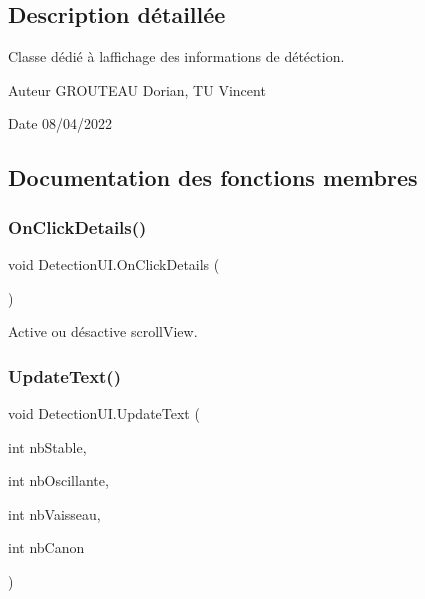 \subsection{Description détaillée}
Classe dédié à l\textquotesingle{}affichage des informations de détéction. 

\begin{DoxyAuthor}{Auteur}
G\+R\+O\+U\+T\+E\+AU Dorian, TU Vincent 
\end{DoxyAuthor}
\begin{DoxyDate}{Date}
08/04/2022 
\end{DoxyDate}


\subsection{Documentation des fonctions membres}
\mbox{\label{class_detection_u_i_a1436465c88d6abe37af82424bf3ae11b}} 
\subsubsection{\texorpdfstring{On\+Click\+Details()}{OnClickDetails()}}
{\footnotesize\ttfamily void Detection\+U\+I.\+On\+Click\+Details (\begin{DoxyParamCaption}{ }\end{DoxyParamCaption})\hspace{0.3cm}{\ttfamily [inline]}}



Active ou désactive scroll\+View. 

\mbox{\label{class_detection_u_i_a1a74833dc3ed95108c3a78bcb3d691be}} 
\subsubsection{\texorpdfstring{Update\+Text()}{UpdateText()}}
{\footnotesize\ttfamily void Detection\+U\+I.\+Update\+Text (\begin{DoxyParamCaption}\item[{int}]{nb\+Stable,  }\item[{int}]{nb\+Oscillante,  }\item[{int}]{nb\+Vaisseau,  }\item[{int}]{nb\+Canon }\end{DoxyParamCaption})\hspace{0.3cm}{\ttfamily [inline]}}



